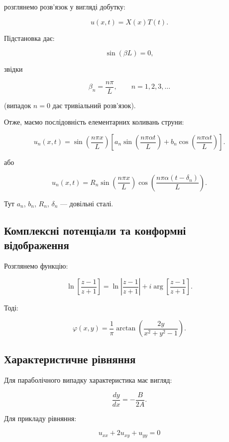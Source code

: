 \documentclass[
  ukrainian,
]{article}
\begin{document}
розглянемо розв'язок у вигляді добутку:

\[
u(x,t)=X(x)T(t).
\]

Підстановка дає:

\[
\sin(\beta L)=0,
\]

звідки

\[
\beta_n = \frac{n\pi}{L}, \qquad n=1,2,3,\ldots
\]

(випадок \(n=0\) дає тривіальний розв'язок).

Отже, маємо послідовність елементарних коливань струни:

\[
u_n(x,t)=\sin\!\left(\frac{n\pi x}{L}\right)
\left[a_n \sin\!\left(\frac{n\pi \alpha t}{L}\right)
+ b_n \cos\!\left(\frac{n\pi \alpha t}{L}\right)\right].
\]

або

\[
u_n(x,t)=R_n \sin\!\left(\frac{n\pi x}{L}\right)
\cos\!\left(\frac{n\pi \alpha (t-\delta_n)}{L}\right).
\]

Тут \(a_n\), \(b_n\), \(R_n\), \(\delta_n\) --- довільні сталі.

\subsection{Комплексні потенціали та конформні
відображення}\label{ux43aux43eux43cux43fux43bux435ux43aux441ux43dux456-ux43fux43eux442ux435ux43dux446ux456ux430ux43bux438-ux442ux430-ux43aux43eux43dux444ux43eux440ux43cux43dux456-ux432ux456ux434ux43eux431ux440ux430ux436ux435ux43dux43dux44f}

Розглянемо функцію:

\[
\ln\left[\frac{z-1}{z+1}\right]
= \ln\left|\frac{z-1}{z+1}\right|
+ i \arg\left[\frac{z-1}{z+1}\right].
\]

Тоді:

\[
\varphi(x,y)=\frac{1}{\pi}\arctan\left(\frac{2y}{x^2+y^2-1}\right).
\]

\subsection{Характеристичне
рівняння}\label{ux445ux430ux440ux430ux43aux442ux435ux440ux438ux441ux442ux438ux447ux43dux435-ux440ux456ux432ux43dux44fux43dux43dux44f}

Для параболічного випадку характеристика має вигляд:

\[
\frac{dy}{dx} = -\frac{B}{2A}.
\]

Для прикладу рівняння:

\[
u_{xx} + 2u_{xy} + u_{yy} = 0
\]
\end{document}
